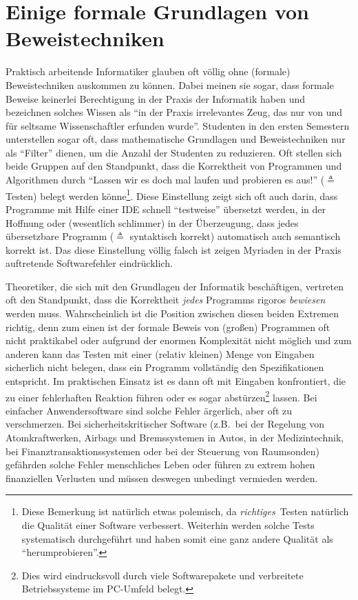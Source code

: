 \section{Einige formale Grundlagen von Beweistechniken}
\label{sec:proof} Praktisch
arbeitende Informatiker glauben oft völlig ohne (formale)
Beweistechniken auskommen zu können. Dabei meinen sie sogar, dass
formale Beweise keinerlei Berechtigung in der Praxis der Informatik
haben und bezeichnen solches Wissen als "`in der Praxis irrelevantes
Zeug, das nur von und für seltsame Wissenschaftler erfunden
wurde"'. Studenten in den ersten Semestern unterstellen sogar oft,
dass mathematische Grundlagen und Beweistechniken nur als "`Filter"'
dienen, um die Anzahl der Studenten zu reduzieren. Oft stellen sich
beide Gruppen auf den Standpunkt, dass die Korrektheit von Programmen
und Algorithmen durch "`Lassen wir es doch mal laufen und probieren es
aus!"' ($\triangleq$ Testen) belegt werden könne\footnote{Diese
Bemerkung ist natürlich etwas polemisch, da \emph{richtiges} Testen 
natürlich die Qualität einer Software verbessert. Weiterhin werden 
solche Tests systematisch durchgeführt und haben somit eine ganz andere 
Qualität als "`herumprobieren"'.}. Diese Einstellung zeigt sich oft 
auch darin, dass Programme mit Hilfe einer IDE schnell "`testweise"' 
übersetzt werden, in der Hoffnung oder (wesentlich schlimmer) in der
Überzeugung, dass jedes übersetzbare Programm ($\triangleq$
syntaktisch korrekt) automatisch auch semantisch korrekt ist. Das
diese Einstellung völlig falsch ist zeigen Myriaden in der Praxis
auftretende Softwarefehler eindrücklich.

Theoretiker, die sich mit den Grundlagen der Informatik beschäftigen,
vertreten oft den Standpunkt, dass die Korrektheit \emph{jedes}
Programms rigoros \emph{bewiesen} werden muss. Wahrscheinlich ist die
Position zwischen diesen beiden Extremen richtig, denn zum einen ist
der formale Beweis von (großen) Programmen oft nicht praktikabel oder
aufgrund der enormen Komplexität nicht möglich und zum anderen kann das 
Testen mit einer (relativ kleinen) Menge von Eingaben sicherlich nicht 
belegen, dass ein Programm vollständig den Spezifikationen entspricht. 
Im praktischen Einsatz ist es dann oft mit Eingaben konfrontiert, die 
zu einer fehlerhaften Reaktion führen oder es sogar 
abstürzen\footnote{Dies wird eindrucksvoll durch viele Softwarepakete 
und verbreitete Betriebssysteme im PC-Umfeld belegt.} lassen. Bei 
einfacher Anwendersoftware sind solche Fehler ärgerlich, aber oft zu
verschmerzen. Bei sicherheitskritischer Software (z.B.~bei der
Regelung von Atomkraftwerken, Airbags und Bremssystemen in Autos, in
der Medizintechnik, bei Finanztransaktionssystemen oder bei der 
Steuerung von Raumsonden) gefährden solche Fehler menschliches 
Leben oder führen zu extrem hohen finanziellen Verlusten und müssen 
deswegen unbedingt vermieden werden.


